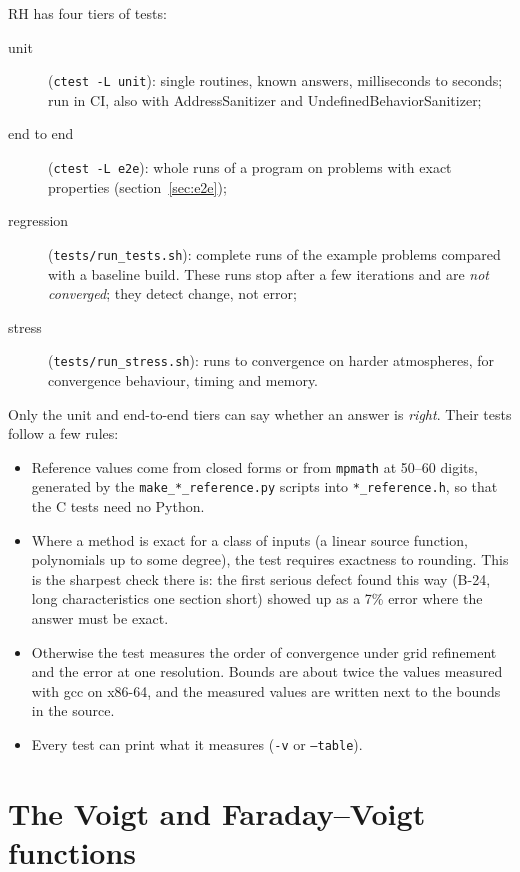 \documentclass[11pt,a4paper]{article}
\newcommand{\code}[1]{\texttt{#1}}
\begin{document}
RH has four tiers of tests:
\begin{description}
\item[unit] (\code{ctest -L unit}): single routines, known answers,
  milliseconds to seconds; run in CI, also with AddressSanitizer and
  UndefinedBehaviorSanitizer;
\item[end to end] (\code{ctest -L e2e}): whole runs of a program on
  problems with exact properties (section~\ref{sec:e2e});
\item[regression] (\code{tests/run\_tests.sh}): complete runs of the
  example problems compared with a baseline build. These runs stop after
  a few iterations and are \emph{not converged}; they detect change, not
  error;
\item[stress] (\code{tests/run\_stress.sh}): runs to convergence on
  harder atmospheres, for convergence behaviour, timing and memory.
\end{description}
Only the unit and end-to-end tiers can say whether an answer is \emph{right}. Their tests
follow a few rules:
\begin{itemize}
\item Reference values come from closed forms or from \code{mpmath} at
  50--60 digits, generated by the \code{make\_*\_reference.py} scripts
  into \code{*\_reference.h}, so that the C tests need no Python.
\item Where a method is exact for a class of inputs (a linear source
  function, polynomials up to some degree), the test requires exactness
  to rounding. This is the sharpest check there is: the first serious
  defect found this way (B-24, long characteristics one section short)
  showed up as a 7\% error where the answer must be exact.
\item Otherwise the test measures the order of convergence under grid
  refinement and the error at one resolution. Bounds are about twice the
  values measured with gcc on x86-64, and the measured values are written
  next to the bounds in the source.
\item Every test can print what it measures (\code{-v} or \code{--table}).
\end{itemize}

\section[The Voigt and Faraday-Voigt functions]{The Voigt and Faraday--Voigt functions}
\label{sec:voigt}
\end{document}
